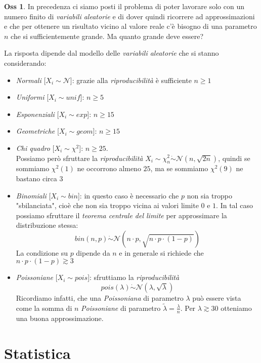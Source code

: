 \documentclass[12pt, a4paper]{report}
\theoremstyle{definition}
\newtheorem*{observation}{Oss}
\DeclareRobustCommand{\norm}{\mathcal{N}}
\begin{document}
\begin{observation}
	In precedenza ci siamo posti il problema di poter lavorare solo con un
	numero finito di \emph{variabili aleatorie} e di dover quindi ricorrere ad
	approssimazioni e che per ottenere un risultato vicino al valore reale c'è
	bisogno di una parametro $n$ che si sufficientemente grande. Ma quanto grande
	deve essere?

	La risposta dipende dal modello delle \emph{variabili aleatorie} che si stanno
	considerando:
	\begin{itemize}
		\item \emph{Normali} [$X_i\sim\norm$]: grazie alla \emph{riproducibilità}
		è sufficiente $n\geq 1$
		\item \emph{Uniformi} [$X_i\sim unif$]: $n\geq 5$
		\item \emph{Esponenziali} [$X_i\sim exp$]: $n\geq 15$
		\item \emph{Geometriche} [$X_i\sim geom$]: $n\geq 15$
		\item \emph{Chi quadro} [$X_i\sim\chi^2$]: $n\geq 25$.\\
		Possiamo però sfruttare la \emph{riproducibilità} \(X_i\sim\chi^2_n\dot
		{\sim}\norm(n,\sqrt{2n})\), quindi se sommiamo \(\chi^2(1)\) ne occorrono
		almeno $25$, ma se sommiamo \(\chi^2(9)\) ne bastano circa $3$
		\item \emph{Binomiali} [$X_i\sim bin$]: in questo caso è necessario che
		$p$ non sia troppo "sbilanciata", cioè che non sia troppo vicina ai
		valori limite $0$ e $1$. In tal caso possiamo sfruttare il \emph{teorema
		centrale del limite} per approssimare la distribuzione stessa:
		\[bin(n,p)\dot{\sim}\norm(n\cdot p, \sqrt{n\cdot p\cdot (1-p)})\]
		La condizione su $p$ dipende da $n$ e in generale si richiede che \(n\cdot p\cdot 
		(1-p)\apprge3\)
		\item \emph{Poissoniane} [$X_i\sim pois$]: sfruttiamo la \emph{riproducibilità}
		\[pois(\lambda)\dot{\sim}\norm(\lambda, \sqrt{\lambda})\]
		Ricordiamo infatti, che una \emph{Poissoniana} di parametro $\lambda$ può
		essere vista come la somma di $n$ \emph{Poissoniane} di parametro
		$\tilde{\lambda}=\frac{\lambda}{n}$. Per $\lambda\apprge30$ otteniamo
		una buona approssimazione.
	\end{itemize}
\end{observation}

\chapter{Statistica}
\end{document}
